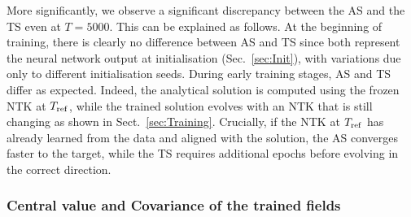 More significantly, we observe a significant discrepancy between the AS and the
TS even at $T=5000$. This can be explained as follows. At the beginning of
training, there is clearly no difference between AS and TS since both represent
the neural network output at initialisation (Sec.~\ref{sec:Init}), with
variations due only to different initialisation seeds. During early training
stages, AS and TS differ as expected. Indeed, the analytical solution is
computed using the frozen NTK at $T_{\rm ref}$, while the trained solution
evolves with an NTK that is still changing as shown in Sect.~\ref{sec:Training}.
Crucially, if the NTK at $T_{\rm ref}$ has already learned from the data and
aligned with the solution, the AS converges faster to the target, while the TS
requires additional epochs before evolving in the correct direction.

\subsubsection{Central value and Covariance of the trained fields}
\label{sec:CentralAndCovariance}

